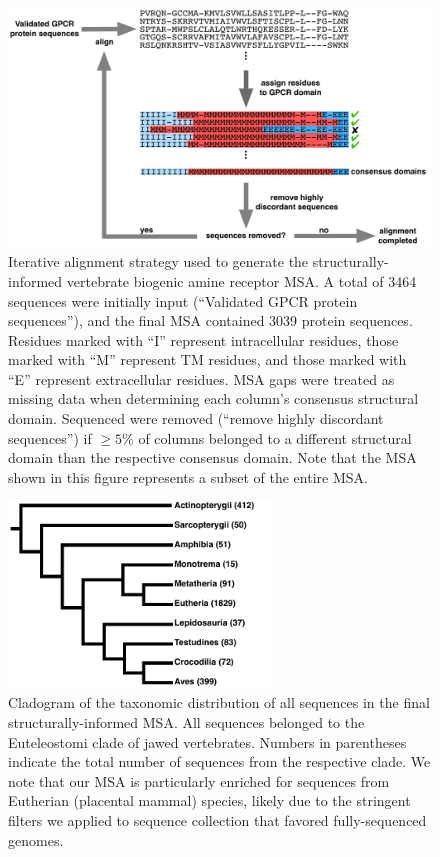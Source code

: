 \documentclass[fleqn,10pt]{wlpeerj}
\begin{document}
\begin{figure}[htbp]
	\centerline{\includegraphics[width=18cm]{figures/alignment_flowchart.pdf}}
	\caption{\label{flowchart} Iterative alignment strategy used to generate the structurally-informed vertebrate biogenic amine receptor MSA. A total of 3464 sequences were initially input (``Validated GPCR protein sequences''), and the final MSA contained 3039 protein sequences. Residues marked with ``I'' represent intracellular residues, those marked with ``M'' represent TM residues, and those marked with ``E'' represent extracellular residues. MSA gaps were treated as missing data when determining each column's consensus structural domain. Sequenced were removed (``remove highly discordant sequences'') if $\geq 5\%$ of columns belonged to a different structural domain than the respective consensus domain. Note that the MSA shown in this figure represents a subset of the entire MSA.}
\end{figure}


\begin{figure}[htbp]
	\centerline{\includegraphics[width=7cm]{figures/taxonomic_distribution.pdf}}
	\caption{\label{taxa_dist} Cladogram of the taxonomic distribution of all sequences in the final structurally-informed MSA. All sequences belonged to the Euteleostomi clade of jawed vertebrates. Numbers in parentheses indicate the total number of sequences from the respective clade. We note that our MSA is particularly enriched for sequences from Eutherian (placental mammal) species, likely due to the stringent filters we applied to sequence collection that favored fully-sequenced genomes.}
\end{figure}
\end{document}
